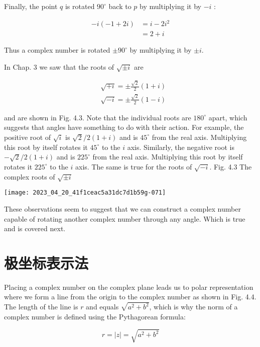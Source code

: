 Finally, the point $q$ is rotated $90^{\circ}$ back to $p$ by multiplying it by $-i$ :

$$
    \begin{aligned}
        -i(-1+2 i) & =i-2 i^{2} \\
                   & =2+i
    \end{aligned}
$$

Thus a complex number is rotated $\pm 90^{\circ}$ by multiplying it by $\pm i$.

In Chap. 3 we saw that the roots of $\sqrt{ \pm i}$ are

$$
    \begin{aligned}
         & \sqrt{+i}= \pm \frac{\sqrt{2}}{2}(1+i) \\
         & \sqrt{-i}= \pm \frac{\sqrt{2}}{2}(1-i)
    \end{aligned}
$$

and are shown in Fig. 4.3. Note that the individual roots are $180^{\circ}$ apart, which suggests that angles have something to do with their action. For example, the positive root of $\sqrt{i}$ is $\sqrt{2} / 2(1+i)$ and is $45^{\circ}$ from the real axis. Multiplying this root by itself rotates it $45^{\circ}$ to the $i$ axis. Similarly, the negative root is $-\sqrt{2} / 2(1+i)$ and is $225^{\circ}$ from the real axis. Multiplying this root by itself rotates it $225^{\circ}$ to the $i$ axis. The same is true for the roots of $\sqrt{-i}$. Fig. 4.3 The complex roots of $\sqrt{ \pm i}$

\begin{center}
    \texttt{[image: 2023\_04\_20\_41f1ceac5a31dc7d1b59g-071]}
\end{center}

These observations seem to suggest that we can construct a complex number capable of rotating another complex number through any angle. Which is true and is covered next.

\section{极坐标表示法}
Placing a complex number on the complex plane leads us to polar representation where we form a line from the origin to the complex number as shown in Fig. 4.4. The length of the line is $r$ and equals $\sqrt{a^{2}+b^{2}}$, which is why the norm of a complex number is defined using the Pythagorean formula:

$$
    r=|z|=\sqrt{a^{2}+b^{2}}
$$

